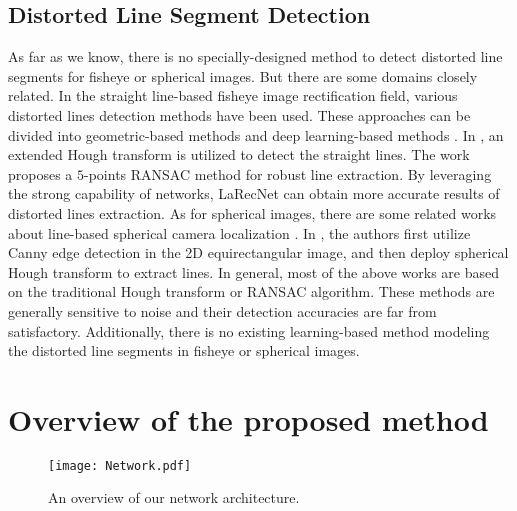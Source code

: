 \documentclass[letterpaper, 10 pt, conference]{ieeeconf}
\begin{document}
\subsection{Distorted Line Segment Detection} \label{sec2-2}
As far as we know, there is no specially-designed method to detect distorted line segments for fisheye or spherical images. But there are some domains closely related. In the straight line-based fisheye image rectification field, various distorted lines detection methods have been used. These approaches can be divided into geometric-based methods \cite{FisheyeRectification1, FisheyeRectification2} and deep learning-based  methods \cite{FisheyeRectification3}. In \cite{FisheyeRectification1}, an extended Hough transform is utilized to detect the straight lines. The work \cite{FisheyeRectification2} proposes a $5$-points RANSAC method for robust line extraction. By leveraging the strong capability of networks, LaRecNet \cite{FisheyeRectification3} can obtain more accurate results of distorted lines extraction. As for spherical images, there are some related works about line-based spherical camera localization \cite{IndoorLocalization1, IndoorLocalization2}. In \cite{IndoorLocalization2}, the authors first utilize Canny edge detection in the 2D equirectangular image, and then deploy spherical Hough transform to extract lines. In general, most of the above works are based on the traditional Hough transform or RANSAC algorithm. These methods are generally sensitive to noise and their detection accuracies are far from satisfactory. Additionally, there is no existing learning-based method modeling the distorted line segments in fisheye or spherical images. 

\section{Overview of the proposed method} \label{sec3}

\begin{figure}[t]
	\begin{center}
		\texttt{[image: Network.pdf]}
	\end{center}
	\caption{An overview of our network architecture.}
	\label{fig:2}
\end{figure}
\end{document}
